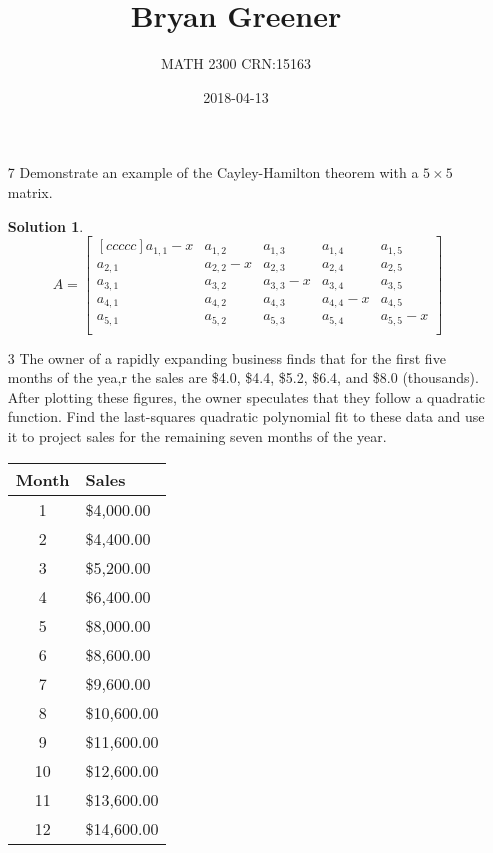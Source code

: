 \documentclass[12pt]{article}
\title{Bryan Greener}
\author{MATH 2300 CRN:15163}
\date{2018-04-13}
\theoremstyle{definition}
\newtheorem*{solution}{Solution} %
\theoremstyle{plain}
\begin{document}
\maketitle

\TabPositions{4cm}

\begin{enumerate}
\item[7]Demonstrate an example of the Cayley-Hamilton theorem with a $5\times 5$ matrix.
	\begin{solution}
	\[ A=\begin{bmatrix}[ccccc]
		a_{1,1}-x&a_{1,2}&a_{1,3}&a_{1,4}&a_{1,5}\\
		a_{2,1}&a_{2,2}-x&a_{2,3}&a_{2,4}&a_{2,5}\\
		a_{3,1}&a_{3,2}&a_{3,3}-x&a_{3,4}&a_{3,5}\\
		a_{4,1}&a_{4,2}&a_{4,3}&a_{4,4}-x&a_{4,5}\\
		a_{5,1}&a_{5,2}&a_{5,3}&a_{5,4}&a_{5,5}-x\\\end{bmatrix} \]
	\end{solution}
\item[3]The owner of a rapidly expanding business finds that for the first five months of the yea,r the sales are \$4.0, \$4.4, \$5.2, \$6.4, and \$8.0 (thousands). After plotting these figures, the owner speculates that they follow a quadratic function. Find the last-squares quadratic polynomial fit to these data and use it to project sales for the remaining seven months of the year.
	\begin{center}
	\begin{tabular}{c|l}
	Month&Sales\\
	\hline
	1&\$4,000.00\\
	2&\$4,400.00\\
	3&\$5,200.00\\
	4&\$6,400.00\\
	5&\$8,000.00\\
	6&\$8,600.00\\
	7&\$9,600.00\\
	8&\$10,600.00\\
	9&\$11,600.00\\
	10&\$12,600.00\\
	11&\$13,600.00\\
	12&\$14,600.00\\
	\end{tabular}
	\end{center}


\end{enumerate}
\end{document}

